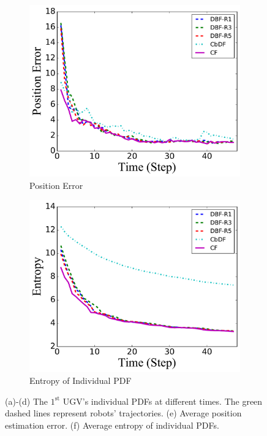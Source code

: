 \documentclass[journal]{IEEEtranTIE}
\theoremstyle{remark}
\begin{document}
\begin{figure}
\begin{subfigure}[b]{0.23\textwidth}
		\includegraphics[width=\textwidth]{figures/brg_mov_sen_mov_tar_pos_err.pdf}
		\caption{Position Error}\label{fig:mov_sen_mov_tar_pos_err}
	\end{subfigure}
	\begin{subfigure}[b]{0.23\textwidth}
		\includegraphics[width=\textwidth]{figures/brg_mov_sen_mov_tar_entropy.pdf}
		\caption{Entropy of Individual PDF}\label{fig:mov_sen_mov_tar_entropy}
	\end{subfigure}
	\caption{(a)-(d) The $1^\text{st}$ UGV's individual PDFs at different times. The green dashed lines represent robots' trajectories. (e) Average position estimation error. (f) Average entropy of individual PDFs.}
	\label{fig:mov_sen_mov_tar}
\end{figure}
\end{document}
